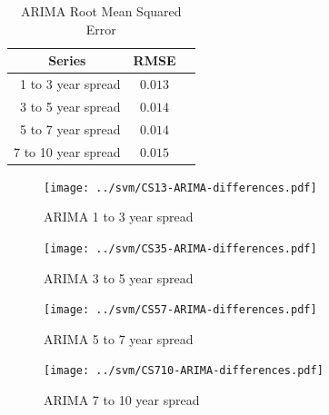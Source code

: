 \documentclass[12pt]{article}
\begin{document}
        \begin{table}[H]
            \centering
            \caption{ARIMA Root Mean Squared Error}
            \begin{tabular}{|r|c|c|} \hline
                \multicolumn{1}{|c|}{Series}                & \multicolumn{1}{|c|}{RMSE}   \\ \hline\hline
                \multicolumn{1}{|r|}{1 to 3 year spread}    & \multicolumn{1}{|c|}{$0.013$}    \\ \hline
                \multicolumn{1}{|r|}{3 to 5 year spread}    & \multicolumn{1}{|c|}{$0.014$}   \\ \hline
                \multicolumn{1}{|r|}{5 to 7 year spread}    & \multicolumn{1}{|c|}{$0.014$}    \\ \hline
                \multicolumn{1}{|r|}{7 to 10 year spread}   & \multicolumn{1}{|c|}{$0.015$}    \\ \hline
            \end{tabular}
            \label{tab:ARIMA}
        \end{table}

        \begin{minipage}{0.5\textwidth}
            \begin{figure}[H]
                \centering
                \caption{ARIMA 1 to 3 year spread}
                \texttt{[image: ../svm/CS13-ARIMA-differences.pdf]}
                \label{fig:ARIMA13}
            \end{figure}
        \end{minipage}
        \begin{minipage}{0.5\textwidth}
            \begin{figure}[H]
                \centering
                \caption{ARIMA 3 to 5 year spread}
                \texttt{[image: ../svm/CS35-ARIMA-differences.pdf]}
                \label{fig:ARIMA35}
            \end{figure}
        \end{minipage}

        \begin{minipage}{0.5\textwidth}
            \begin{figure}[H]
                \centering
                \caption{ARIMA 5 to 7 year spread}
                \texttt{[image: ../svm/CS57-ARIMA-differences.pdf]}
                \label{fig:ARIMA57}
            \end{figure}
        \end{minipage}
        \begin{minipage}{0.5\textwidth}
            \begin{figure}[H]
                \centering
                \caption{ARIMA 7 to 10 year spread}
                \texttt{[image: ../svm/CS710-ARIMA-differences.pdf]}
                \label{fig:ARIMA710}
            \end{figure}
        \end{minipage}
\end{document}
